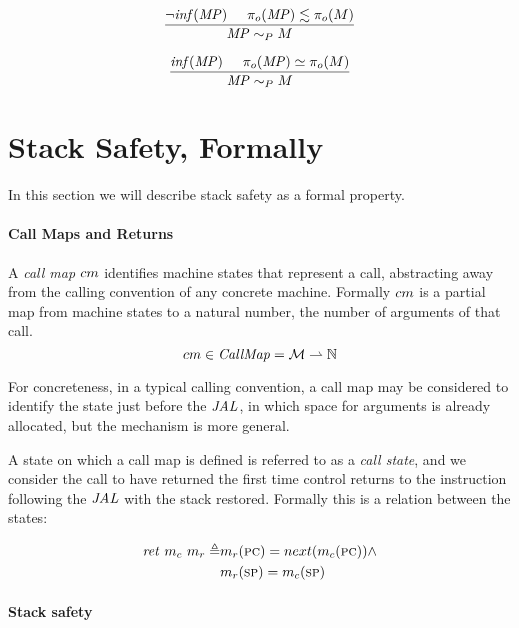 \documentclass[acmsmall,review,anonymous]{acmart}\settopmatter{printfolios=true,printccs=false,printacmref=false}
\begin{document}
\[\frac{\neg \mathit{inf}(\mathit{MP}) \hspace{.5cm} \pi_o(\mathit{MP}) \lesssim \pi_o(M)}
           {\mathit{MP} \sim_P M}\]
    
\[\frac{\mathit{inf}(\mathit{MP}) \hspace{.5cm} \pi_o(\mathit{MP}) \simeq \pi_o(M)}
           {\mathit{MP} \sim_P M}\]
    
\section{Stack Safety, Formally}

In this section we will describe stack safety as a formal
property.

\paragraph*{Call Maps and Returns}

A {\it call map} $cm$ identifies machine states that represent a
call, abstracting away from the calling convention of any concrete
machine. Formally $cm$ is a partial map from machine states to a
natural number, the number of arguments of that call.
%
\[cm \in \mathit{CallMap} = {\mathcal M} \rightharpoonup \mathbb{N}\]

For concreteness, in a typical calling convention, a call map may be
considered to identify the state just before the \(\mathit{JAL}\), in which
space for arguments is already allocated, but the mechanism is more
general.

A state on which a call map is defined is referred to as a {\it call
  state}, and we consider the call to have returned the first time
control returns to the instruction following the \(\mathit{JAL}\) with the
stack restored. Formally this is a relation between the states:
    
\[\begin{split}
\mathit{ret}\ m_c\ m_r \triangleq & m_r(\textsc{pc}) = next(m_c(\textsc{pc})) \land \\
& m_r(\textsc{sp}) = m_c(\textsc{sp})
\end{split}\]


\paragraph*{Stack safety}
  
\end{document}
